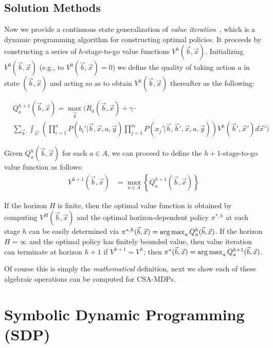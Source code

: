 \documentclass[letterpaper]{article}
\def\argmax{\operatornamewithlimits{arg\,max}}
\begin{document}
\subsection{Solution Methods}

\label{sec:soln}

Now we provide a continuous state generalization of {\it
value iteration}~\cite{bellman}, which is a dynamic programming
algorithm for constructing optimal policies.  It proceeds by
constructing a series of $h$-stage-to-go value functions
$V^h(\vec{b},\vec{x})$.  Initializing $V^0(\vec{b},\vec{x})$ 
(e.g., to $V^0(\vec{b},\vec{x}) = 0$) 
we define the quality of taking action $a$ in state
$(\vec{b},\vec{x})$ and acting so as to obtain $V^{h}(\vec{b},\vec{x})$ 
thereafter as the following:
\vspace{-3mm}

{\footnotesize
\begin{align}
& Q_a^{h+1}(\vec{b},\vec{x}) = \max_{\vec{y}} \Bigg( R_a(\vec{b},\vec{x}) + \gamma \cdot \label{eq:qfun} \\ 
& \sum_{\vec{b}'} \int_{\vec{x}'} \left( \prod_{i=1}^n P(b_i'|\vec{b},\vec{x},a,\vec{y}) \prod_{j=1}^m P(x_j'|\vec{b},\vec{b}',\vec{x},a,\vec{y}) \right) V^h(\vec{b}',\vec{x}') d\vec{x}' \Bigg) \nonumber
\end{align}}

Given $Q_a^h(\vec{b},\vec{x})$ for each $a \in A$, we can proceed
to define the $h+1$-stage-to-go value function as follows:
\begin{align}
V^{h+1}(\vec{b},\vec{x}) & = \max_{a \in A} \left\{ Q^{h+1}_a(\vec{b},\vec{x}) \right\} \label{eq:vfun}
\end{align}

If the horizon $H$ is finite, then the optimal value function is
obtained by computing $V^H(\vec{b},\vec{x})$ and the optimal
horizon-dependent policy $\pi^{*,h}$ at each stage $h$ can be easily
determined via 
$\pi^{*,h}(\vec{b},\vec{x}) = \argmax_a Q^h_a(\vec{b},\vec{x})$.  
If the horizon 
$H = \infty$ and the optimal policy has finitely bounded value, 
then value iteration can terminate at horizon $h+1$ if 
$V^{h+1} = V^{h}$; then 
$\pi^*(\vec{b},\vec{x}) = \argmax_a Q^{h+1}_a(\vec{b},\vec{x})$.

Of course this is simply the \emph{mathematical} definition, next
we show each of these algebraic operations can be computed for
CSA-MDPs.

\section{Symbolic Dynamic Programming (SDP)}
\end{document}
